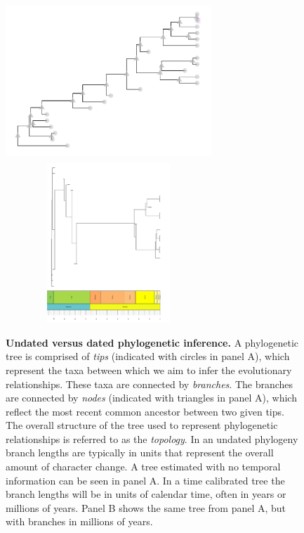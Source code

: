 \documentclass[11pt]{article}
\newcommand{\rw}[1]{{\textcolor{red}{[RW: #1]}}} %
\begin{document}
\begin{figure}[h!]

\centering

\includegraphics[height=6cm, width=7.75cm]{figures/undated.pdf} \includegraphics[height=6cm, width=7.75cm]{figures/scaley.pdf}
\label{fig:undated}

\caption{\textbf{Undated versus dated phylogenetic inference.}
A phylogenetic tree is comprised of \textit{tips} (indicated with circles in panel A), which represent the taxa between which we aim to infer the evolutionary relationships.
These taxa are connected by \textit{branches}. %
The branches are connected by \textit{nodes} (indicated with triangles in panel A), which reflect the most recent common ancestor between two given tips. 
The overall structure of the tree used to represent phylogenetic relationships is referred to as the \textit{topology}.
In an undated phylogeny branch lengths are typically in units that represent the overall amount of character change.
A tree estimated with no temporal information can be seen in panel A.
In a time calibrated tree %
the branch lengths will be in units of calendar time, often in years or millions of years. %
Panel B shows the same tree from panel A, but with branches in millions of years.}

\end{figure}
\end{document}
